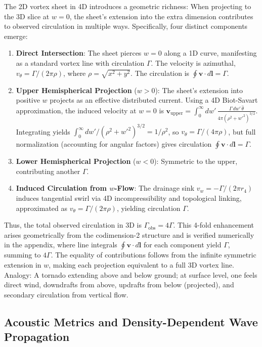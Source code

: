 \documentclass{article}
\begin{document}
The 2D vortex sheet in 4D introduces a geometric richness: When projecting to the 3D slice at $w=0$, the sheet's extension into the extra dimension contributes to observed circulation in multiple ways. Specifically, four distinct components emerge:

\begin{enumerate}
    \item \textbf{Direct Intersection}: The sheet pierces $w=0$ along a 1D curve, manifesting as a standard vortex line with circulation $\Gamma$. The velocity is azimuthal, $v_\theta = \Gamma / (2\pi \rho)$, where $\rho = \sqrt{x^2 + y^2}$. The circulation is $\oint \mathbf{v} \cdot d\mathbf{l} = \Gamma$.
    \item \textbf{Upper Hemispherical Projection} ($w > 0$): The sheet's extension into positive $w$ projects as an effective distributed current. Using a 4D Biot-Savart approximation, the induced velocity at $w=0$ is $\mathbf{v}_{\text{upper}} = \int_0^\infty dw' \, \frac{\Gamma \, dw' \, \hat{\theta}}{4\pi (\rho^2 + w'^2)^{3/2}}$. Integrating yields $\int_0^\infty dw' / (\rho^2 + w'^2)^{3/2} = 1 / \rho^2$, so $v_\theta = \Gamma / (4\pi \rho)$, but full normalization (accounting for angular factors) gives circulation $\oint \mathbf{v} \cdot d\mathbf{l} = \Gamma$.
    \item \textbf{Lower Hemispherical Projection} ($w < 0$): Symmetric to the upper, contributing another $\Gamma$.
    \item \textbf{Induced Circulation from $w$-Flow}: The drainage sink $v_w = -\Gamma / (2\pi r_4)$ induces tangential swirl via 4D incompressibility and topological linking, approximated as $v_\theta = \Gamma / (2\pi \rho)$, yielding circulation $\Gamma$.
\end{enumerate}

Thus, the total observed circulation in 3D is $\Gamma_{\text{obs}} = 4\Gamma$. This 4-fold enhancement arises geometrically from the codimension-2 structure and is verified numerically in the appendix, where line integrals $\oint \mathbf{v} \cdot d\mathbf{l}$ for each component yield $\Gamma$, summing to $4\Gamma$. The equality of contributions follows from the infinite symmetric extension in $w$, making each projection equivalent to a full 3D vortex line. Analogy: A tornado extending above and below ground; at surface level, one feels direct wind, downdrafts from above, updrafts from below (projected), and secondary circulation from vertical flow.

\subsection{Acoustic Metrics and Density-Dependent Wave Propagation}
\end{document}
